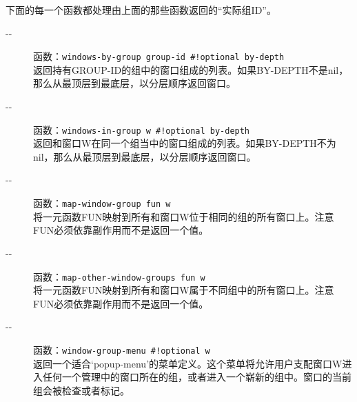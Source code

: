 \documentclass{book}
\begin{document}
\begin{CJK*}{UTF8}{gbsn}
下面的每一个函数都处理由上面的那些函数返回的``实际组ID''。
\begin{description}
\item[-{}-] 函数：\verb|windows-by-group group-id #!optional by-depth|\\
返回持有GROUP-ID的组中的窗口组成的列表。如果BY-DEPTH不是nil，那么从最顶层到最底层，以分层顺序返回窗口。
\item[-{}-] 函数：\verb|windows-in-group w #!optional by-depth|\\
返回和窗口W在同一个组当中的窗口组成的列表。如果BY-DEPTH不为nil，那么从最顶层到最底层，以分层顺序返回窗口。
\item[-{}-] 函数：\verb|map-window-group fun w|\\
将一元函数FUN映射到所有和窗口W位于相同的组的所有窗口上。注意FUN必须依靠副作用而不是返回一个值。
\item[-{}-] 函数：\verb|map-other-window-groups fun w|\\
将一元函数FUN映射到所有和窗口W属于不同组中的所有窗口上。注意FUN必须依靠副作用而不是返回一个值。
\item[-{}-] 函数：\verb|window-group-menu #!optional w|\\
返回一个适合`popup-menu'的菜单定义。这个菜单将允许用户支配窗口W进入任何一个管理中的窗口所在的组，或者进入一个崭新的组中。窗口的当前组会被检查或者标记。
\end{description}

\end{CJK*}
\end{document}
